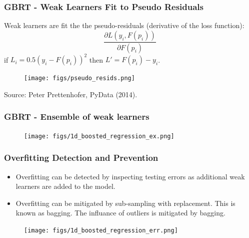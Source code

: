 \documentclass[t, pdftex]{beamer}
\begin{document}
\begin{frame}
\frametitle{GBRT - Weak Learners Fit to Pseudo Residuals}
Weak learners are fit the the pseudo-residuals (derivative of the loss function): 
\[
\frac{\partial L(y_i, F(p_i))}{\partial F(p_i)}
\]
if $L_i=0.5(y_i-F(p_i))^2$ then $L' = F(p_i)-y_i$.  
\begin{figure}[!htbp]
\centering
\texttt{[image: figs/pseudo\_resids.png]}
\label{model_overview}
\end{figure}
Source: Peter Prettenhofer, PyData (2014).
\end{frame}

\begin{frame}
\frametitle{GBRT - Ensemble of weak learners}

\begin{figure}[!htbp]
\centering
\texttt{[image: figs/1d\_boosted\_regression\_ex.png]}
\label{model_overview}
\end{figure}
\end{frame}

\begin{frame}[shrink=10]
\frametitle{Overfitting Detection and Prevention}
\begin{itemize}
\item Overfitting can be detected by inspecting testing errors as additional weak learners are added to the model.
\item Overfitting can be mitigated by sub-sampling with replacement.  This is known as bagging.  The influance of outliers is mitigated by bagging.
\end{itemize}
\begin{figure}[!htbp]
\centering
\texttt{[image: figs/1d\_boosted\_regression\_err.png]}
\label{model_overview}
\end{figure}
\end{frame}
\end{document}
